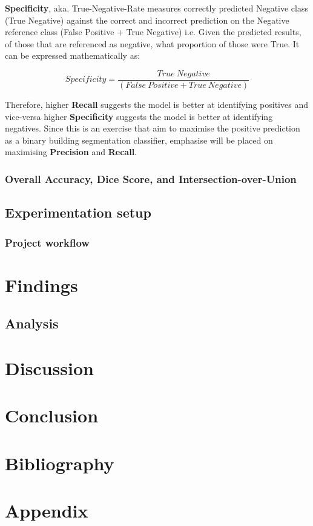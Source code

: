 \documentclass[11pt, a4paper, twoside]{report}
\begin{document}
\textbf{Specificity}, aka. True-Negative-Rate measures correctly predicted Negative class (True Negative) against the correct and incorrect prediction on the Negative reference class (False Positive + True Negative) i.e. Given the predicted results, of those that are referenced as negative, what proportion of those were True. It can be expressed mathematically as:

\begin{equation}
  Specificity = \frac{True\ Negative} {(False\ Positive + True\ Negative)}
\end{equation}

Therefore, higher \textbf{Recall} suggests the model is better at identifying positives and vice-versa higher \textbf{Specificity} suggests the model is better at identifying negatives. Since this is an exercise that aim to maximise the positive prediction as a binary building segmentation classifier, emphasise will be placed on maximising \textbf{Precision} and \textbf{Recall}.

\subsection{Overall Accuracy, Dice Score, and Intersection-over-Union}\label{2ndorder}
\section{Experimentation setup}\label{ExpSetup}
\subsection{Project workflow}\label{ProjWorkflow}

\newpage

\chapter{Findings}\label{findings}
\section{Analysis}\label{analysis}

\newpage

\chapter{Discussion}\label{Discuss}

\newpage

\chapter{Conclusion}\label{Conclude}

\newpage

\chapter{Bibliography}\label{Bib}

\newpage

\appendix

\chapter{Appendix}\label{Appen}
\end{document}

